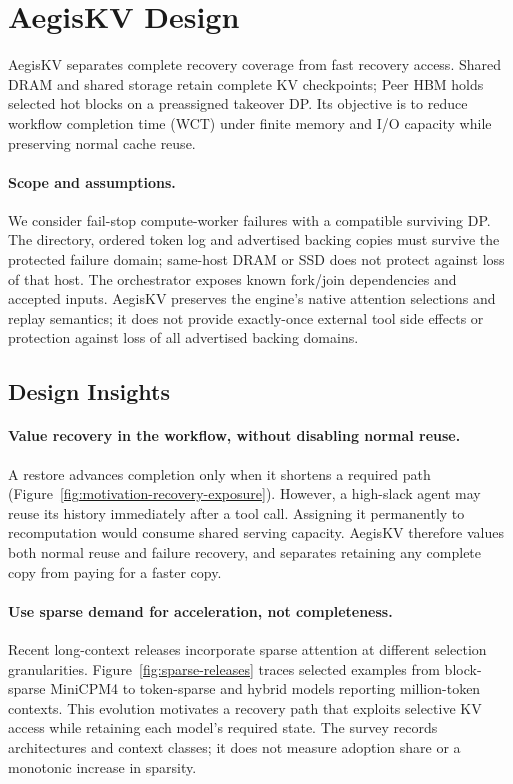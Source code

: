 \section{AegisKV Design}
\label{sec:design}

AegisKV separates complete recovery coverage from fast recovery access.
Shared DRAM and shared storage retain complete KV checkpoints; Peer HBM
holds selected hot blocks on a preassigned takeover DP. Its objective is
to reduce workflow completion time (WCT) under finite memory and I/O
capacity while preserving normal cache reuse.

\paragraph{Scope and assumptions.}
We consider fail-stop compute-worker failures with a compatible surviving
DP. The directory, ordered token log and advertised backing copies must
survive the protected failure domain; same-host DRAM or SSD does not
protect against loss of that host. The orchestrator exposes known
fork/join dependencies and accepted inputs. AegisKV preserves the engine's
native attention selections and replay semantics; it does not provide
exactly-once external tool side effects or protection against loss of all
advertised backing domains.

\subsection{Design Insights}
\label{sec:design-insights}

\paragraph{Value recovery in the workflow, without disabling normal reuse.}
A restore advances completion only when it shortens a required path
(Figure~\ref{fig:motivation-recovery-exposure}). However, a high-slack
agent may reuse its history immediately after a tool call. Assigning it
permanently to recomputation would consume shared serving capacity.
AegisKV therefore values both normal reuse and failure recovery, and
separates retaining any complete copy from paying for a faster copy.

\paragraph{Use sparse demand for acceleration, not completeness.}
Recent long-context releases incorporate sparse attention at different
selection granularities. Figure~\ref{fig:sparse-releases} traces selected
examples from block-sparse MiniCPM4 to token-sparse and hybrid models
reporting million-token contexts. This evolution motivates a recovery
path that exploits selective KV access while retaining each model's
required state. The survey records architectures and context classes;
it does not measure adoption share or a monotonic increase in sparsity.

